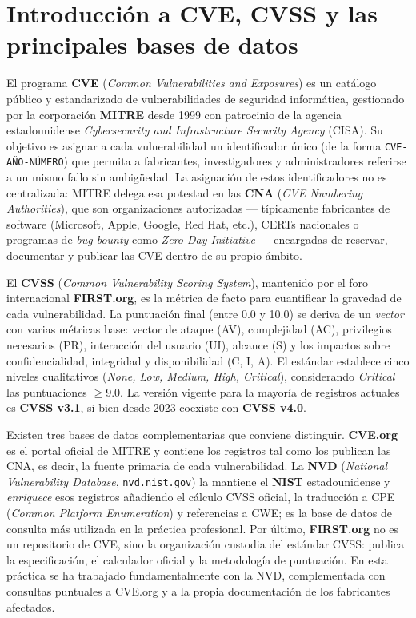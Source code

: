 \chapter{Introducción a CVE, CVSS y las principales bases de datos}

El programa \textbf{CVE} (\textit{Common Vulnerabilities and Exposures}) es un catálogo público y estandarizado de vulnerabilidades de seguridad informática, gestionado por la corporación \textbf{MITRE} desde 1999 con patrocinio de la agencia estadounidense \textit{Cybersecurity and Infrastructure Security Agency} (CISA). Su objetivo es asignar a cada vulnerabilidad un identificador único (de la forma \texttt{CVE-AÑO-NÚMERO}) que permita a fabricantes, investigadores y administradores referirse a un mismo fallo sin ambigüedad. La asignación de estos identificadores no es centralizada: MITRE delega esa potestad en las \textbf{CNA} (\textit{CVE Numbering Authorities}), que son organizaciones autorizadas --- típicamente fabricantes de software (Microsoft, Apple, Google, Red Hat, etc.), CERTs nacionales o programas de \textit{bug bounty} como \textit{Zero Day Initiative} --- encargadas de reservar, documentar y publicar las CVE dentro de su propio ámbito.

El \textbf{CVSS} (\textit{Common Vulnerability Scoring System}), mantenido por el foro internacional \textbf{FIRST.org}, es la métrica de facto para cuantificar la gravedad de cada vulnerabilidad. La puntuación final (entre 0.0 y 10.0) se deriva de un \textit{vector} con varias métricas base: vector de ataque (AV), complejidad (AC), privilegios necesarios (PR), interacción del usuario (UI), alcance (S) y los impactos sobre confidencialidad, integridad y disponibilidad (C, I, A). El estándar establece cinco niveles cualitativos (\textit{None, Low, Medium, High, Critical}), considerando \textit{Critical} las puntuaciones $\geq 9.0$. La versión vigente para la mayoría de registros actuales es \textbf{CVSS v3.1}, si bien desde 2023 coexiste con \textbf{CVSS v4.0}.

Existen tres bases de datos complementarias que conviene distinguir. \textbf{CVE.org} es el portal oficial de MITRE y contiene los registros tal como los publican las CNA, es decir, la fuente primaria de cada vulnerabilidad. La \textbf{NVD} (\textit{National Vulnerability Database}, \texttt{nvd.nist.gov}) la mantiene el \textbf{NIST} estadounidense y \textit{enriquece} esos registros añadiendo el cálculo CVSS oficial, la traducción a CPE (\textit{Common Platform Enumeration}) y referencias a CWE; es la base de datos de consulta más utilizada en la práctica profesional. Por último, \textbf{FIRST.org} no es un repositorio de CVE, sino la organización custodia del estándar CVSS: publica la especificación, el calculador oficial y la metodología de puntuación. En esta práctica se ha trabajado fundamentalmente con la NVD, complementada con consultas puntuales a CVE.org y a la propia documentación de los fabricantes afectados.
